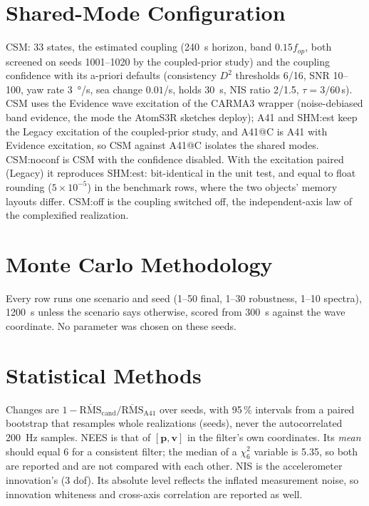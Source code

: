 \documentclass[conference]{IEEEtran}
\DeclareRobustCommand{\vct}[1]{\bm{#1}}
\begin{document}
\section{Shared-Mode Configuration}
CSM: 33 states, the estimated coupling (\SI{240}{s} horizon, band
$0.15f_{op}$, both screened on seeds 1001--1020 by the coupled-prior study)
and the coupling confidence with its a-priori defaults (consistency $D^2$
thresholds 6/16, SNR 10--100, yaw rate \SI{3}{\degree/s}, sea change
$0.01$/s, holds \SI{30}{s}, NIS ratio 2/1.5, $\tau=3/60$\,s). CSM uses the
Evidence wave excitation of the CARMA3 wrapper (noise-debiased band
evidence, the mode the AtomS3R sketches deploy); A41 and SHM:est keep the
Legacy excitation of the coupled-prior study, and A41@C is A41 with
Evidence excitation, so CSM against A41@C isolates the shared modes.
CSM:noconf is CSM with the confidence disabled. With the excitation paired
(Legacy) it reproduces SHM:est: bit-identical in the unit test, and equal to
float rounding ($5\times10^{-5}$) in the benchmark rows, where the two
objects' memory layouts differ. CSM:off is the coupling switched off, the
independent-axis law of the complexified realization.

\section{Monte Carlo Methodology}
Every row runs one scenario and seed (1--50 final, 1--30 robustness, 1--10
spectra), \SI{1200}{s} unless the scenario says otherwise, scored from
\SI{300}{s} against the wave coordinate. No parameter was chosen on these
seeds.

\section{Statistical Methods}
Changes are $1-\overline{\mathrm{RMS}}_{\mathrm{cand}}/\overline{\mathrm{RMS}}_{\mathrm{A41}}$
over seeds, with 95\,\% intervals from a paired bootstrap that resamples whole
realizations (seeds), never the autocorrelated \SI{200}{Hz} samples. NEES is
that of $[\vct p,\vct v]$ in the filter's own coordinates. Its \emph{mean}
should equal 6 for a consistent filter; the median of a $\chi^2_6$ variable
is 5.35, so both are reported and are not compared with each other. NIS is
the accelerometer innovation's (3 dof). Its absolute level reflects the
inflated measurement noise, so innovation whiteness and cross-axis
correlation are reported as well.
\end{document}
